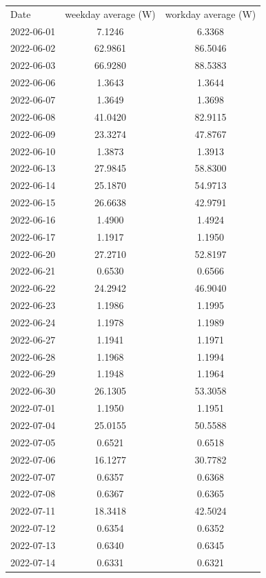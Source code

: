 \begin{table}
	\centering
	\begin{tabular}{|l|c|c|}
		Date& weekday average (W)& workday average (W)\\
		2022-06-01&     7.1246&     6.3368\\
		2022-06-02&   62.9861&    86.5046\\
		2022-06-03&  66.9280 &   88.5383\\
		2022-06-06 &  1.3643 &    1.3644\\
		2022-06-07&   1.3649 &    1.3698\\
		2022-06-08&  41.0420 &   82.9115
		\\ 2022-06-09 & 23.3274 &   47.8767
		\\ 2022-06-10  & 1.3873 &    1.3913
		\\ 2022-06-13  &27.9845 &   58.8300
		\\ 2022-06-14  &25.1870 &   54.9713
		\\ 2022-06-15  &26.6638 &   42.9791
		\\ 2022-06-16  & 1.4900 &    1.4924
		\\ 2022-06-17  & 1.1917 &    1.1950
		\\ 2022-06-20  &27.2710 &   52.8197
		\\ 2022-06-21  & 0.6530 &    0.6566
		\\ 2022-06-22  &24.2942 &   46.9040
		\\ 2022-06-23   &1.1986 &    1.1995
		\\ 2022-06-24   &1.1978 &    1.1989
		\\ 2022-06-27   &1.1941 &    1.1971
		\\ 2022-06-28   &1.1968 &    1.1994
		\\ 2022-06-29   &1.1948 &    1.1964
		\\ 2022-06-30  &26.1305 &   53.3058
		\\ 2022-07-01  &1.1950   &  1.1951
		\\ 2022-07-04  &25.0155  &  50.5588
		\\ 2022-07-05   &0.6521 &    0.6518
		\\ 2022-07-06  &16.1277&    30.7782
		\\ 2022-07-07   &0.6357&     0.6368
		\\ 2022-07-08   &0.6367&    0.6365
		\\ 2022-07-11  &18.3418&  42.5024
		\\ 2022-07-12   &0.6354&    0.6352
		\\ 2022-07-13   &0.6340&     0.6345
		\\ 2022-07-14   &0.6331&     0.6321

\end{tabular}
\end{table}
